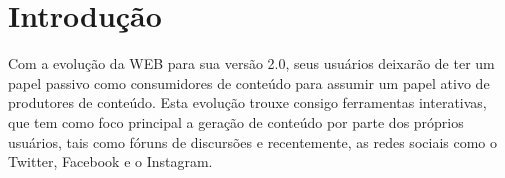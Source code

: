 \section{\esp Introdução}

Com a evolução da WEB para sua versão 2.0, seus usuários deixarão de ter um papel passivo como consumidores de conteúdo para assumir um papel ativo de produtores de conteúdo. Esta evolução trouxe consigo ferramentas interativas, que tem como foco principal a geração de conteúdo por parte dos próprios usuários, tais como fóruns de discursões e recentemente, as redes sociais como o Twitter, Facebook e o Instagram.